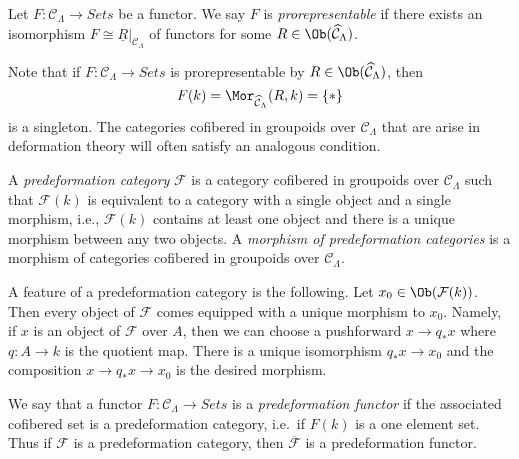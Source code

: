 \begin{definition}
\label{definition-prorepresentable}
Let $F : \mathcal{C}_\Lambda \to \textit{Sets}$ be a functor.
We say $F$ is {\it prorepresentable} if there exists an isomorphism
$F \cong \underline{R}|_{\mathcal{C}_\Lambda}$ of functors for some
$R \in \Ob(\widehat{\mathcal{C}}_\Lambda)$.
\end{definition}

\noindent
Note that if $F : \mathcal{C}_\Lambda \to \textit{Sets}$ is prorepresentable
by $R \in \Ob(\widehat{\mathcal{C}}_\Lambda)$, then
$$
F(k) = \Mor_{\widehat{\mathcal{C}}_\Lambda}(R, k) = \{*\}
$$
is a singleton. The categories cofibered in groupoids over
$\mathcal{C}_\Lambda$ that are arise in deformation theory will often satisfy
an analogous condition.

\begin{definition}
\label{definition-predeformation-category}
A {\it predeformation category} $\mathcal{F}$ is a category cofibered
in groupoids over $\mathcal{C}_\Lambda$ such that $\mathcal{F}(k)$ is
equivalent to a category with a single object and a single morphism,
i.e., $\mathcal{F}(k)$ contains at least one object and there is a
unique morphism between any two objects. A {\it morphism of predeformation
categories} is a morphism of categories cofibered in groupoids over
$\mathcal{C}_\Lambda$.
\end{definition}

\noindent
A feature of a predeformation category is the following.
Let $x_0 \in \Ob(\mathcal{F}(k))$. Then every object of
$\mathcal{F}$ comes equipped with a unique morphism to $x_0$.
Namely, if $x$ is an object of $\mathcal{F}$ over $A$, then we
can choose a pushforward $x \to q_*x$ where $q : A \to k$ is the quotient
map. There is a unique isomorphism $q_*x \to x_0$ and the composition
$x \to q_*x \to x_0$ is the desired morphism.

\begin{remark}
\label{remark-predeformation-functor}
We say that a functor $F: \mathcal{C}_\Lambda \to \textit{Sets}$
is a {\it predeformation functor} if the associated cofibered set is a
predeformation category, i.e.\ if $F(k)$ is a one element set.  Thus if
$\mathcal{F}$ is a predeformation category, then $\overline{\mathcal{F}}$ is a
predeformation functor.
\end{remark}

